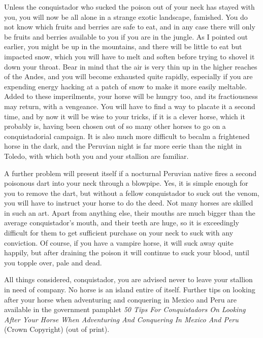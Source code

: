 Unless the conquistador who sucked the poison out of your neck has stayed with you, you will now be all alone in a strange exotic landscape, famished. You do not know which fruits and berries are safe to eat, and in any case there will only be fruits and berries available to you if you are in the jungle. As I pointed out earlier, you might be up in the mountains, and there will be little to eat but impacted snow, which you will have to melt and soften before trying to shovel it down your throat. Bear in mind that the air is very thin up in the higher reaches of the Andes, and you will become exhausted quite rapidly, especially if you are expending energy hacking at a patch of snow to make it more easily meltable. Added to these imperilments, your horse will be hungry too, and its fractiousness may return, with a vengeance. You will have to find a way to placate it a second time, and by now it will be wise to your tricks, if it is a clever horse, which it probably is, having been chosen out of so many other horses to go on a conquistadorial campaign. It is also much more difficult to becalm a frightened horse in the dark, and the Peruvian night is far more eerie than the night in Toledo, with which both you and your stallion are familiar.

A further problem will present itself if a nocturnal Peruvian native fires a second poisonous dart into your neck through a blowpipe. Yes, it is simple enough for you to remove the dart, but without a fellow conquistador to suck out the venom, you will have to instruct your horse to do the deed. Not many horses are skilled in such an art. Apart from anything else, their mouths are much bigger than the average conquistador's mouth, and their teeth are huge, so it is exceedingly difficult for them to get sufficient purchase on your neck to suck with any conviction. Of course, if you have a vampire horse, it will suck away quite happily, but after draining the poison it will continue to suck your blood, until you topple over, pale and dead.

All things considered, conquistador, you are advised never to leave your stallion in need of company. No horse is an island entire of itself. Further tips on looking after your horse when adventuring and conquering in Mexico and Peru are available in the government pamphlet \emph{50 Tips For Conquistadors On Looking After Your Horse When Adventuring And Conquering In Mexico And Peru} (Crown Copyright) (out of print).